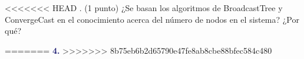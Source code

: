 <<<<<<< HEAD
. (1 punto) ¿Se basan los algoritmos de BroadcastTree y ConvergeCast en el conocimiento acerca del número de nodos en el sistema? ¿Por qué? 


=======
\newpage
\textbf{\textcolor{MidnightBlue}{4.}}
>>>>>>> 8b75eb6b2d65790e47fe8ab8cbe88bfec584c480
